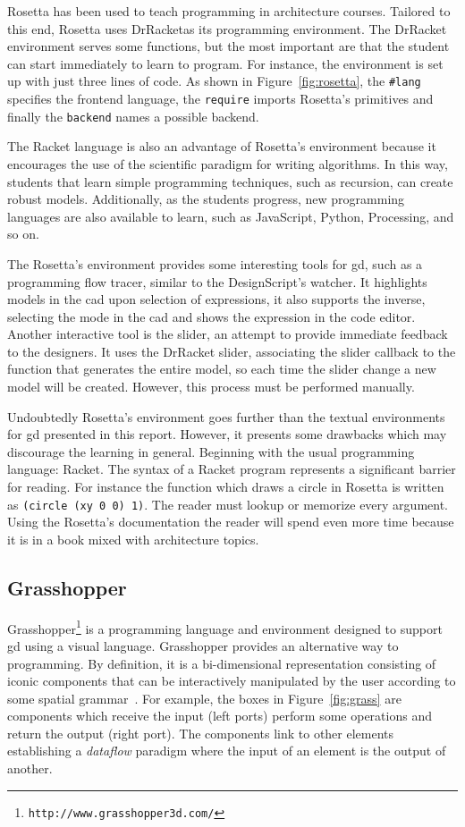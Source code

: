 Rosetta has been used to teach programming in architecture courses. Tailored to this end, Rosetta uses DrRacketas its programming environment. The DrRacket environment serves some functions, but the most important are that the student can start immediately to learn to program. For instance, the environment is set up with just three lines of code. As shown in Figure~\ref{fig:rosetta}, the \texttt{\#lang} specifies the frontend language, the \texttt{require} imports Rosetta's primitives and finally the \texttt{backend} names a possible backend.

The Racket language is also an advantage of Rosetta's environment because it encourages the use of the scientific paradigm for writing algorithms. In this way, students that learn simple programming techniques, such as recursion, can create robust models. Additionally, as the students progress, new programming languages are also available to learn, such as JavaScript, Python, Processing, and so on.

The Rosetta's environment provides some interesting tools for \gls{gd}, such as a programming flow tracer, similar to the DesignScript's watcher. It highlights models in the \gls{cad} upon selection of expressions, it also supports the inverse, selecting the mode in the \gls{cad} and shows the expression in the code editor. Another interactive tool is the slider, an attempt to provide immediate feedback to the designers. It uses the DrRacket slider, associating the slider callback to the function that generates the entire model, so each time the slider change a new model will be created. However, this process must be performed manually.

Undoubtedly Rosetta's environment goes further than the textual environments for \gls{gd} presented in this report. However, it presents some drawbacks which may discourage the learning in general. Beginning with the usual programming language: Racket. The syntax of a Racket program represents a significant barrier for reading. For instance the function which draws a circle in Rosetta is written as \texttt{(circle (xy 0 0) 1)}. The reader must lookup or memorize every argument. Using the Rosetta's documentation the reader will spend even more time because it is in a book mixed with architecture topics.
\subsection{Grasshopper}
\label{subsec:grasshopper}
Grasshopper\footnote{\texttt{http://www.grasshopper3d.com/}} is a programming language and environment designed to support \gls{gd} using a visual language. Grasshopper provides an alternative way to programming. By definition, it is a bi-dimensional representation consisting of iconic components that can be interactively manipulated by the user according to some spatial grammar~\citep{myers1990taxonomies}. For example, the boxes in Figure~\ref{fig:grass} are components which receive the input (left ports) perform some operations and return the output (right port). The components link to other elements establishing a \textit{dataflow} paradigm where the input of an element is the output of another.


